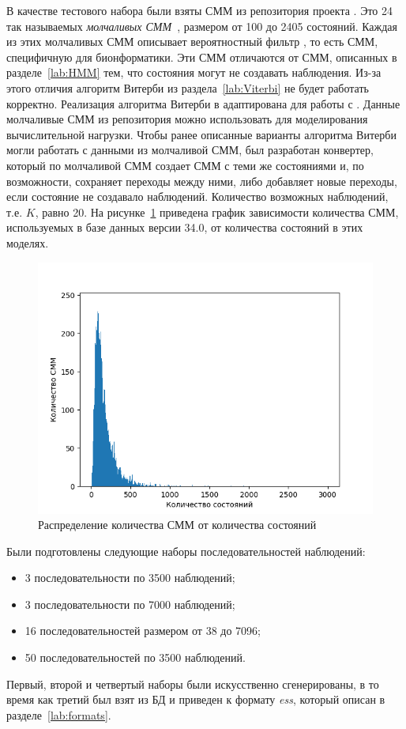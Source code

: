 В качестве тестового набора были взяты СММ из репозитория  
проекта .
Это 24 так называемых \emph{молчаливых СММ}~\cite{silentHMM}, 
размером от 100 до 2405 состояний.
Каждая из этих молчаливых СММ описывает вероятностный фильтр , то есть СММ, специфичную для бионформатики.
Эти СММ отличаются от СММ, описанных в разделе~\ref{lab:HMM} 
тем, что состояния могут не создавать наблюдения.
Из-за этого отличия алгоритм Витерби из 
раздела~\ref{lab:Viterbi} не будет работать корректно.
Реализация алгоритма Витерби в  адаптирована для работы с .
Данные молчаливые СММ из репозитория  можно использовать 
для моделирования вычислительной нагрузки.
Чтобы ранее описанные варианты алгоритма Витерби могли 
работать с данными из молчаливой СММ, был разработан 
конвертер, который по молчаливой СММ создает СММ с теми же 
состояниями и, по возможности, сохраняет переходы между ними, 
либо добавляет новые переходы, если состояние не создавало 
наблюдений.
Количество возможных наблюдений, т.е. $K$, равно 20.
На рисунке~\ref{HMM_mean} приведена график зависимости количества СММ, используемых в базе данных  версии 34.0, от количества состояний в этих моделях.
\begin{figure}[h!]
  \centering
  \includegraphics[width=\columnwidth]{mean_HMM.png}
  \caption{Распределение количества СММ от количества состояний}
  \label{HMM_mean}
\end{figure}

Были подготовлены следующие наборы последовательностей наблюдений:
\begin{itemize}
	\item 3 последовательности по 3500 наблюдений;
	\item 3 последовательности по 7000 наблюдений;
	\item 16 последовательностей размером от 38 до 7096;
	\item 50 последовательностей по 3500 наблюдений.
\end{itemize}
Первый, второй и четвертый наборы были искусственно сгенерированы, в то время 
как третий был взят из БД  и 
приведен к формату \emph{ess}, который описан в 
разделе~\ref{lab:formats}.


